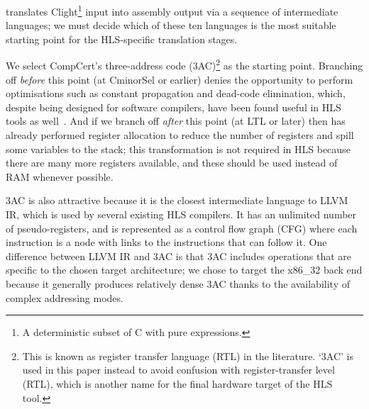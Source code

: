 \def\numcompcertlanguages{ten}

\compcert{} translates Clight\footnote{A deterministic subset of C with pure expressions.} input into assembly output via a sequence of intermediate languages; we must decide which of these \numcompcertlanguages{} languages is the most suitable starting point for the HLS-specific translation stages.

We select CompCert's three-address code (3AC)\footnote{This is known as register transfer language (RTL) in the \compcert{} literature. `3AC' is used in this paper instead to avoid confusion with register-transfer level (RTL), which is another name for the final hardware target of the HLS tool.} as the starting point. Branching off \emph{before} this point (at CminorSel or earlier) denies \compcert{} the opportunity to perform optimisations such as constant propagation and dead-code elimination, which, despite being designed for software compilers, have been found useful in HLS tools as well~\cite{cong+11}. And if we branch off \emph{after} this point (at LTL or later) then \compcert{} has already performed register allocation to reduce the number of registers and spill some variables to the stack; this transformation is not required in HLS because there are many more registers available, and these should be used instead of RAM whenever possible. %

3AC is also attractive because it is the closest intermediate language to LLVM IR, which is used by several existing HLS compilers. %
It has an unlimited number of pseudo-registers, and is represented as a control flow graph (CFG) where each instruction is a node with links to the instructions that can follow it. One difference between LLVM IR and 3AC is that 3AC includes operations that are specific to the chosen target architecture; we chose to target the x86\_32 back end because it generally produces relatively dense 3AC thanks to the availability of complex addressing modes.%

